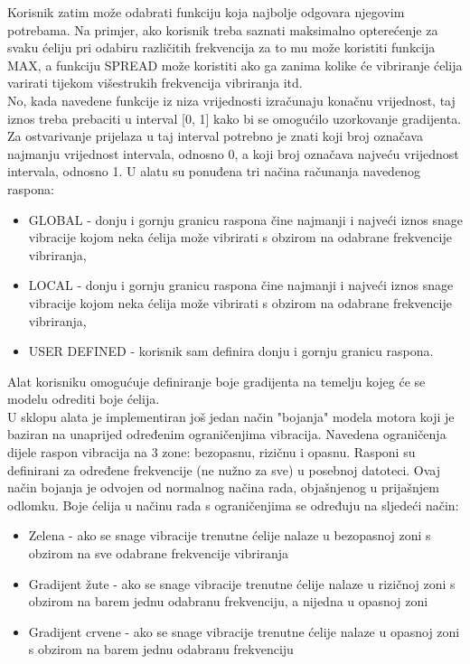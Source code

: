 \documentclass[times, utf8, diplomski]{fer}
\begin{document}
Korisnik zatim može odabrati funkciju koja najbolje odgovara njegovim potrebama. Na primjer, ako korisnik treba saznati maksimalno opterećenje za svaku ćeliju pri odabiru različitih frekvencija za to mu može koristiti funkcija MAX, a funkciju SPREAD može koristiti ako ga zanima kolike će vibriranje ćelija varirati tijekom višestrukih frekvencija vibriranja itd.\\

No, kada navedene funkcije iz niza vrijednosti izračunaju konačnu vrijednost, taj iznos treba prebaciti u interval [0, 1] kako bi se omogućilo uzorkovanje gradijenta. Za ostvarivanje prijelaza u taj interval potrebno je znati koji broj označava najmanju vrijednost intervala, odnosno 0, a koji broj označava najveću vrijednost intervala, odnosno 1. U alatu su ponuđena tri načina računanja navedenog raspona:
\begin{itemize}
\item GLOBAL - donju i gornju granicu raspona čine najmanji i najveći iznos snage vibracije kojom neka ćelija može vibrirati s obzirom na odabrane frekvencije vibriranja,
\item LOCAL - donju i gornju granicu raspona čine najmanji i najveći iznos snage vibracije kojom neka ćelija može vibrirati s obzirom na odabrane frekvencije vibriranja,
\item USER DEFINED - korisnik sam definira donju i gornju granicu raspona.\\
\end{itemize}

Alat korisniku omogućuje definiranje boje gradijenta na temelju kojeg će se modelu odrediti boje ćelija.\\

U sklopu alata je implementiran još jedan način "bojanja" modela motora koji je baziran na unaprijed određenim ograničenjima vibracija. Navedena ograničenja dijele raspon vibracija na 3 zone: bezopasnu, rizičnu i opasnu. Rasponi su definirani za određene frekvencije (ne nužno za sve) u posebnoj datoteci. Ovaj način bojanja je odvojen od normalnog načina rada, objašnjenog u prijašnjem odlomku. Boje ćelija u načinu rada s ograničenjima se određuju na sljedeći način:
\begin{itemize}
\item Zelena - ako se snage vibracije trenutne ćelije nalaze u bezopasnoj zoni s obzirom na sve odabrane frekvencije vibriranja
\item Gradijent žute - ako se snage vibracije trenutne ćelije nalaze u rizičnoj zoni s obzirom na barem jednu odabranu frekvenciju, a nijedna u opasnoj zoni
\item Gradijent crvene - ako se snage vibracije trenutne ćelije nalaze u opasnoj zoni s obzirom na barem jednu odabranu frekvenciju\\
\end{itemize}
\end{document}
